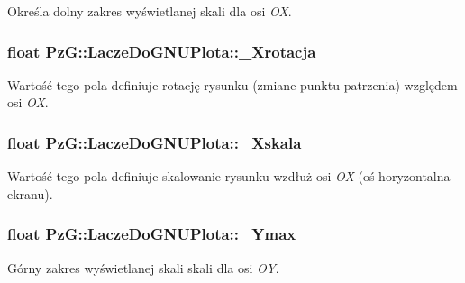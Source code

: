 Określa dolny zakres wyświetlanej skali dla osi {\itshape O\+X}. \hypertarget{class_pz_g_1_1_lacze_do_g_n_u_plota_a21e77f0a2bfb7fed989b6dc2d64b5a7e}{
\subsubsection[{\+\_\+\+Xrotacja}]{\setlength{\rightskip}{0pt plus 5cm}float Pz\+G\+::\+Lacze\+Do\+G\+N\+U\+Plota\+::\+\_\+\+Xrotacja\hspace{0.3cm}{\ttfamily [protected]}}}\label{class_pz_g_1_1_lacze_do_g_n_u_plota_a21e77f0a2bfb7fed989b6dc2d64b5a7e}
Wartość tego pola definiuje rotację rysunku (zmiane punktu patrzenia) względem osi {\itshape O\+X}. \hypertarget{class_pz_g_1_1_lacze_do_g_n_u_plota_a2c9303c4dbb4c9f0ddc4f1fe02eb3f70}{
\subsubsection[{\+\_\+\+Xskala}]{\setlength{\rightskip}{0pt plus 5cm}float Pz\+G\+::\+Lacze\+Do\+G\+N\+U\+Plota\+::\+\_\+\+Xskala\hspace{0.3cm}{\ttfamily [protected]}}}\label{class_pz_g_1_1_lacze_do_g_n_u_plota_a2c9303c4dbb4c9f0ddc4f1fe02eb3f70}
Wartość tego pola definiuje skalowanie rysunku wzdłuż osi {\itshape O\+X} (oś horyzontalna ekranu). \hypertarget{class_pz_g_1_1_lacze_do_g_n_u_plota_ad7dfd3fad82ea0720ec89eacc18410bf}{
\subsubsection[{\+\_\+\+Ymax}]{\setlength{\rightskip}{0pt plus 5cm}float Pz\+G\+::\+Lacze\+Do\+G\+N\+U\+Plota\+::\+\_\+\+Ymax\hspace{0.3cm}{\ttfamily [protected]}}}\label{class_pz_g_1_1_lacze_do_g_n_u_plota_ad7dfd3fad82ea0720ec89eacc18410bf}


Górny zakres wyświetlanej skali skali dla osi {\itshape O\+Y}. 

